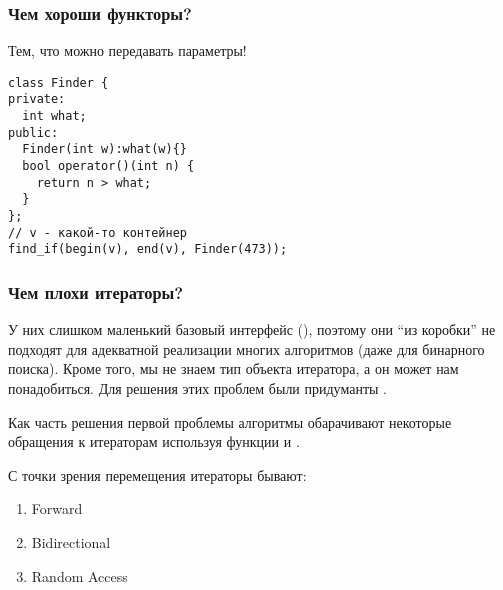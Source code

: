 \subsubsection{Чем хороши функторы?}
Тем, что можно передавать параметры!
\begin{verbatim}
class Finder {
private:
  int what;
public:
  Finder(int w):what(w){}
  bool operator()(int n) {
    return n > what;
  }
};
// v - какой-то контейнер
find_if(begin(v), end(v), Finder(473));
\end{verbatim}

\subsubsection{Чем плохи итераторы?}
У них слишком маленький базовый интерфейс (\cc{++, --, *, ->}), поэтому они ``из коробки'' не подходят для адекватной реализации многих алгоритмов (даже для бинарного поиска). Кроме того, мы не знаем тип объекта итератора, а он может нам понадобиться.
Для решения этих проблем были придуманты .

Как часть решения первой проблемы алгоритмы обарачивают некоторые обращения к итераторам используя функции  и .

С точки зрения перемещения итераторы бывают:
\begin{enumerate}
    \item Forward
    \item Bidirectional
    \item Random Access
\end{enumerate}
